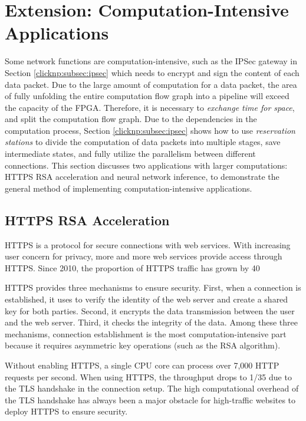 \section{Extension: Computation-Intensive Applications}

Some network functions are computation-intensive, such as the IPSec gateway in Section \ref{clicknp:subsec:ipsec} which needs to encrypt and sign the content of each data packet. Due to the large amount of computation for a data packet, the area of fully unfolding the entire computation flow graph into a pipeline will exceed the capacity of the FPGA. Therefore, it is necessary to \emph{exchange time for space}, and split the computation flow graph. Due to the dependencies in the computation process, Section \ref{clicknp:subsec:ipsec} shows how to use \emph{reservation stations} to divide the computation of data packets into multiple stages, save intermediate states, and fully utilize the parallelism between different connections. This section discusses two applications with larger computations: HTTPS RSA acceleration and neural network inference, to demonstrate the general method of implementing computation-intensive applications.

\subsection{HTTPS RSA Acceleration}

HTTPS is a protocol for secure connections with web services. With increasing user concern for privacy, more and more web services provide access through HTTPS. Since 2010, the proportion of HTTPS traffic has grown by 40%

HTTPS provides three mechanisms to ensure security. First, when a connection is established, it uses to verify the identity of the web server and create a shared key for both parties. Second, it encrypts the data transmission between the user and the web server. Third, it checks the integrity of the data. Among these three mechanisms, connection establishment is the most computation-intensive part because it requires asymmetric key operations (such as the RSA algorithm).

Without enabling HTTPS, a single CPU core can process over 7,000 HTTP requests per second. When using HTTPS, the throughput drops to 1/35 due to the TLS handshake in the connection setup. The high computational overhead of the TLS handshake has always been a major obstacle for high-traffic websites to deploy HTTPS to ensure security.

